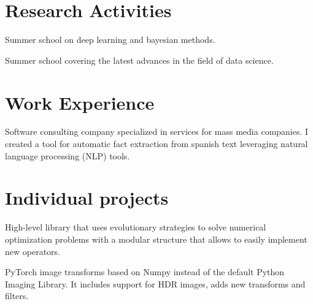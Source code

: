 \documentclass[]{resume}
\begin{document}
\begin{minipage}[t]{0.66\textwidth}
\section{Research Activities}

Summer school on deep learning and bayesian methods.
\sectionsep

Summer school covering the latest advances in the field of data science.

\sectionsep


\section{Work Experience}

Software consulting company specialized in services for mass media companies. I created a tool for automatic fact extraction from spanish text leveraging natural language processing (NLP) tools.


\section{Individual projects}

High-level library that uses evolutionary strategies to solve numerical optimization problems with a modular structure that allows to easily implement new operators.

\sectionsep

PyTorch image transforms based on Numpy instead of the default Python Imaging Library. It includes support for HDR images, adds new transforms and filters.

\end{minipage} 
\end{document}

